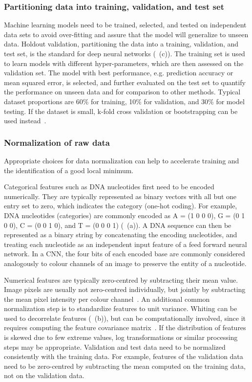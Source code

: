 \subsubsection{Partitioning data into training, validation, and test set} \label{sec:dl_eval}

Machine learning models need to be trained, selected, and tested on independent data sets to avoid over-fitting and assure that the model will generalize to unseen data. Holdout validation, partitioning the data into a training, validation, and test set, is the standard for deep neural networks (~(c)). The training set is used to learn models with different hyper-parameters, which are then assessed on the validation set. The model with best performance, e.g. prediction accuracy or mean squared error, is selected, and further evaluated on the test set to quantify the performance on unseen data and for comparison to other methods. Typical dataset proportions are 60\% for training, 10\% for validation, and 30\% for model testing. If the dataset is small, k-fold cross validation or bootstrapping can be used instead~\citep{hastie_elements_2005}.


\subsubsection{Normalization of raw data}

Appropriate choices for data normalization can help to accelerate training and the identification of a good local minimum.

Categorical features such as DNA nucleotides first need to be encoded numerically. They are typically represented as binary vectors with all but one entry set to zero, which indicates the category (one-hot coding). For example, DNA nucleotides (categories) are commonly encoded as A = (1 0 0 0), G = (0 1 0 0), C = (0 0 1 0), and T = (0 0 0 1) (~(a)). A DNA sequence can then be represented as a binary string by concatenating the encoding nucleotides, and treating each nucleotide as an independent input feature of a feed forward neural network. In a CNN, the four bits of each encoded base are commonly considered analogously to colour channels of an image to preserve the entity of a nucleotide.

Numerical features are typically zero-centred by subtracting their mean value. Image pixels are usually not zero-centred individually, but jointly by subtracting the mean pixel intensity per colour channel~\citep{karpathy_cs231n_2016}. An additional common normalization step is to standardize features to unit variance. Whiting can be used to decorrelate features (~(b)), but can be computationally involved, since it requires computing the feature covariance matrix~\citep{hastie_elements_2005}. If the distribution of features is skewed due to few extreme values, log transformations or similar processing steps may be appropriate. Validation and test data need to be normalized consistently with the training data. For example, features of the validation data need to be zero-centred by subtracting the mean computed on the training data, not on the validation data.

